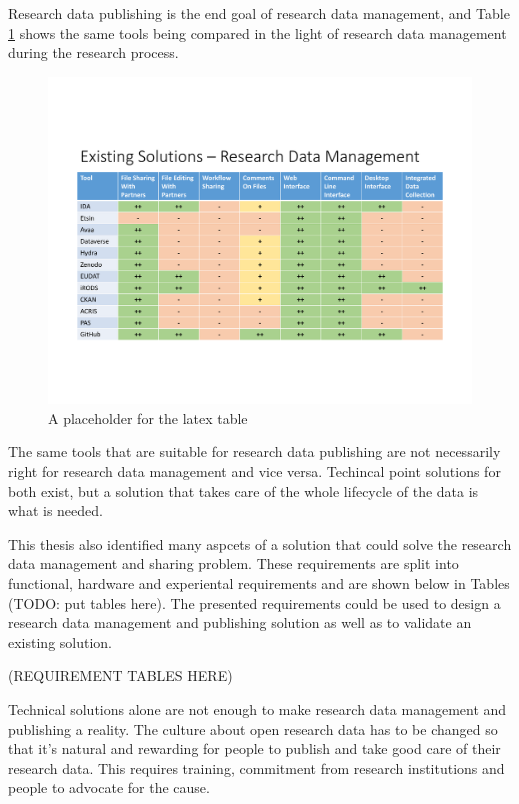 Research data publishing is the end goal of research data management, and
Table \ref{fig:management} shows the same tools being compared in the light
of research data management during the research process.

\begin{figure}
    \begin{centering}
        \includegraphics[width=\textwidth]{images/management}
    \end{centering}
    \caption{A placeholder for the latex table}
    \label{fig:management}
\end{figure}

The same tools that are suitable for research data publishing are not
necessarily right for research data management and vice versa. Techincal
point solutions for both exist, but a solution that takes care of the whole
lifecycle of the data is what is needed.

This thesis also identified many aspcets of a solution that could solve the
research data management and sharing problem. These requirements are split
into functional, hardware and experiental requirements and are shown below
in Tables (TODO: put tables here). The presented requirements could be used
to design a research data management and publishing solution as well as to
validate an existing solution.

(REQUIREMENT TABLES HERE)

Technical solutions alone are not enough to make research data management
and publishing a reality. The culture about open research data has to be
changed so that it's natural and rewarding for people to publish and take
good care of their research data. This requires training, commitment from
research institutions and people to advocate for the cause.
